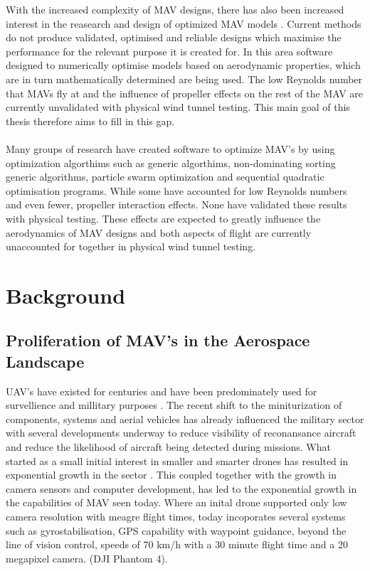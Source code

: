 With the increased complexity of MAV designs, there has also been increased interest in the reasearch and design of optimized MAV models \cite{Ward2017}. Current methods  do not produce validated, optimised and reliable designs which maximise the performance for the relevant purpose it is created for. In this area software designed to numerically optimise models based on aerodynamic properties, which are in turn mathematically determined are being used. The low Reynolds number that MAVs fly at and the influence of propeller effects on the rest of the MAV are currently unvalidated with physical wind tunnel testing. This main goal of this thesis therefore aims to fill in this gap.\\
\\
Many groups of research have  created software to optimize MAV's by using optimization algorthims such as generic algorthims, non-dominating sorting generic algorithms, particle swarm optimization and sequential quadratic optimisation programs. While some have accounted for low Reynolds numbers and even fewer, propeller interaction effects. None have validated these results with physical testing. These effects are expected to greatly influence the aerodynamics of MAV designs and both aspects of flight are currently unaccounted for together in physical wind tunnel testing.
\section{Background}

\subsection{Proliferation of MAV's in the Aerospace Landscape}
\label{subsec:ProliferationMAVs}

UAV's have existed for centuries and have been predominately used for survellience and millitary purposes . The recent shift to the miniturization of components, systems and aerial vehicles has already influenced the military sector with several developments underway to reduce visibility of reconansance aircraft and reduce the likelihood of aircraft being detected during missions. What started as a small initial interest in smaller and smarter drones has resulted in exponential growth in the sector . This coupled together with the growth in camera sensors and computer development, has led to the exponential growth in the capabilities of MAV seen today. Where an inital drone supported only low camera resolution with meagre flight times, today incoporates several systems such as gyrostabilisation, GPS capability with waypoint guidance, beyond the line of vision control, speeds of 70 km/h with a 30 minute flight time and a 20 megapixel camera. (DJI Phantom 4). \\

